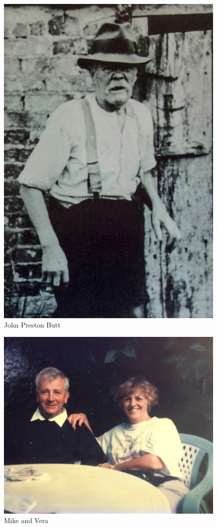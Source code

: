 \begin{figure}
  \centering
  \includegraphics[width=.9\linewidth]{pictures/cropped/John Preston Butt.jpg}
  \caption*{John Preston Butt}
\end{figure}

\begin{figure}
  \centering
  \includegraphics[width=.9\linewidth]{pictures/cropped/Mike and Vera.jpg}
  \caption*{Mike and Vera}
\end{figure}

